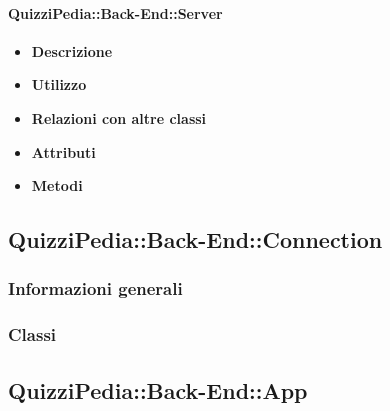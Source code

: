 	\paragraph{QuizziPedia::Back-End::Server}
	\begin{itemize}
		\item \textbf{Descrizione}
		\item \textbf{Utilizzo}
		\item \textbf{Relazioni con altre classi}
		\item \textbf{Attributi}
		\item \textbf{Metodi}
	\end{itemize}

\subsection{QuizziPedia::Back-End::Connection}
\subsubsection{Informazioni generali}
\subsubsection{Classi}

\subsection{QuizziPedia::Back-End::App}
